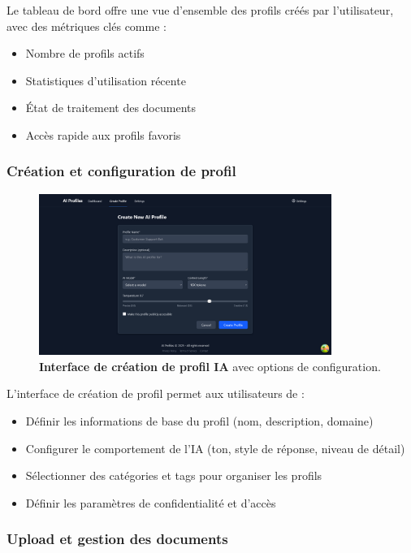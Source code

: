 Le tableau de bord offre une vue d'ensemble des profils créés par l'utilisateur, avec des métriques clés comme :

\begin{itemize}
  \item Nombre de profils actifs
  \item Statistiques d'utilisation récente
  \item État de traitement des documents
  \item Accès rapide aux profils favoris
\end{itemize}

\subsubsection{Création et configuration de profil}

\begin{figure}[H]
  \centering
  \includegraphics[width=0.85\textwidth,keepaspectratio]{pfe-pics/ai-profile-creation/creating_and_ai_prifile.png}
  \caption{\textbf{Interface de création de profil IA} avec options de configuration.}
  \label{fig:profile_creation}
\end{figure}

L'interface de création de profil permet aux utilisateurs de :

\begin{itemize}
  \item Définir les informations de base du profil (nom, description, domaine)
  \item Configurer le comportement de l'IA (ton, style de réponse, niveau de détail)
  \item Sélectionner des catégories et tags pour organiser les profils
  \item Définir les paramètres de confidentialité et d'accès
\end{itemize}

\subsubsection{Upload et gestion des documents}

